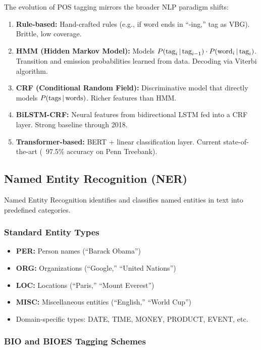 The evolution of POS tagging mirrors the broader NLP paradigm shifts:
\begin{enumerate}
    \item \textbf{Rule-based:} Hand-crafted rules (e.g., if word ends in ``-ing,'' tag as
    VBG). Brittle, low coverage.
    \item \textbf{HMM (Hidden Markov Model):} Models $P(\text{tag}_i \,|\,
    \text{tag}_{i-1}) \cdot P(\text{word}_i \,|\, \text{tag}_i)$. Transition and
    emission probabilities learned from data. Decoding via Viterbi algorithm.
    \item \textbf{CRF (Conditional Random Field):} Discriminative model that directly
    models $P(\text{tags} \,|\, \text{words})$. Richer features than HMM.
    \item \textbf{BiLSTM-CRF:} Neural features from bidirectional LSTM fed into a CRF
    layer. Strong baseline through 2018.
    \item \textbf{Transformer-based:} BERT + linear classification layer. Current
    state-of-the-art (~97.5\% accuracy on Penn Treebank).
\end{enumerate}

\subsection{Named Entity Recognition (NER)}
\label{sec:classical_ner}

Named Entity Recognition identifies and classifies named entities in text into predefined
categories.

\subsubsection{Standard Entity Types}

\begin{itemize}
    \item \textbf{PER:} Person names (``Barack Obama'')
    \item \textbf{ORG:} Organizations (``Google,'' ``United Nations'')
    \item \textbf{LOC:} Locations (``Paris,'' ``Mount Everest'')
    \item \textbf{MISC:} Miscellaneous entities (``English,'' ``World Cup'')
    \item Domain-specific types: DATE, TIME, MONEY, PRODUCT, EVENT, etc.
\end{itemize}

\subsubsection{BIO and BIOES Tagging Schemes}

